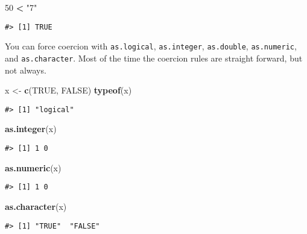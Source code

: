 \documentclass[]{book}
\newenvironment{Shaded}{\begin{snugshade}}{\end{snugshade}}
\newcommand{\KeywordTok}[1]{\textcolor[rgb]{0.13,0.29,0.53}{\textbf{#1}}}
\newcommand{\DecValTok}[1]{\textcolor[rgb]{0.00,0.00,0.81}{#1}}
\newcommand{\StringTok}[1]{\textcolor[rgb]{0.31,0.60,0.02}{#1}}
\newcommand{\OtherTok}[1]{\textcolor[rgb]{0.56,0.35,0.01}{#1}}
\newcommand{\OperatorTok}[1]{\textcolor[rgb]{0.81,0.36,0.00}{\textbf{#1}}}
\newcommand{\NormalTok}[1]{#1}
\theoremstyle{definition}
\theoremstyle{definition}
\theoremstyle{definition}
\theoremstyle{remark}
\begin{document}
\begin{Shaded}
\begin{Highlighting}[]
\DecValTok{50} \OperatorTok{<}\StringTok{ "7"}
\end{Highlighting}
\end{Shaded}

\begin{verbatim}
#> [1] TRUE
\end{verbatim}

You can force coercion with \texttt{as.logical}, \texttt{as.integer},
\texttt{as.double}, \texttt{as.numeric}, and \texttt{as.character}. Most
of the time the coercion rules are straight forward, but not always.

\begin{Shaded}
\begin{Highlighting}[]
\NormalTok{x <-}\StringTok{ }\KeywordTok{c}\NormalTok{(}\OtherTok{TRUE}\NormalTok{, }\OtherTok{FALSE}\NormalTok{)}
\KeywordTok{typeof}\NormalTok{(x)}
\end{Highlighting}
\end{Shaded}

\begin{verbatim}
#> [1] "logical"
\end{verbatim}

\begin{Shaded}
\begin{Highlighting}[]
\KeywordTok{as.integer}\NormalTok{(x)}
\end{Highlighting}
\end{Shaded}

\begin{verbatim}
#> [1] 1 0
\end{verbatim}

\begin{Shaded}
\begin{Highlighting}[]
\KeywordTok{as.numeric}\NormalTok{(x)}
\end{Highlighting}
\end{Shaded}

\begin{verbatim}
#> [1] 1 0
\end{verbatim}

\begin{Shaded}
\begin{Highlighting}[]
\KeywordTok{as.character}\NormalTok{(x)}
\end{Highlighting}
\end{Shaded}

\begin{verbatim}
#> [1] "TRUE"  "FALSE"
\end{verbatim}
\end{document}
